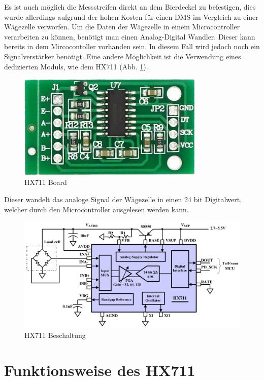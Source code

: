 \documentclass[12pt,journal]{IEEEtran}
\begin{document}
Es ist auch möglich die Messstreifen direkt an dem Bierdeckel zu befestigen, dies wurde allerdings aufgrund der hohen Kosten für einen DMS im Vergleich zu einer Wägezelle verworfen.
Um die Daten der Wägezelle in einem Microcontroller verarbeiten zu können, benötigt man einen Analog-Digital Wandler.
Dieser kann bereits in dem Mircocontoller vorhanden sein.
In diesem Fall wird jedoch noch ein Signalverstärker benötigt.
Eine andere Möglichkeit ist die Verwendung eines dedizierten Moduls, wie dem HX711 \cite{hx711sheet} (Abb. \ref{fig_HX711_board}).
\begin{figure}[h]
  \centering
    \includegraphics[width=3.5in]{images/HX711Board.jpeg}
    \caption{HX711 Board}
  \label{fig_HX711_board}
\end{figure}
Dieser wandelt das analoge Signal der Wägezelle in einen 24 bit Digitalwert, welcher durch den Microcontroller ausgelesen werden kann.
\begin{figure}[htbp]
\centering
\includegraphics[width=7in]{images/HX711.jpg}%
\caption{HX711 Beschaltung}
\label{fig_HX711}
\end{figure}

\pagebreak

\section{Funktionsweise des HX711}
\end{document}

